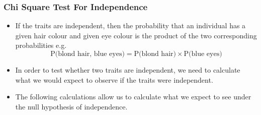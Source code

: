 \documentclass[a4]{beamer}
\begin{document}
\begin{frame}
\frametitle{Chi Square Test For Independence}
\large
\begin{itemize}
	\item If the traits are independent, then the probability that an individual
	has a given hair colour and given eye colour is the product of the
	two corresponding probabilities e.g.
	\[\mbox{P(blond hair, blue eyes)} = \mbox{P(blond hair)}\times \mbox{P(blue eyes)}\]
	\item In order to test whether two traits are independent, we need to
	calculate what we would expect to observe if the traits were
	independent.
	\item The following calculations allow us to calculate what we expect to
	see under the null hypothesis of independence.
\end{itemize}

\end{frame}
\end{document}

